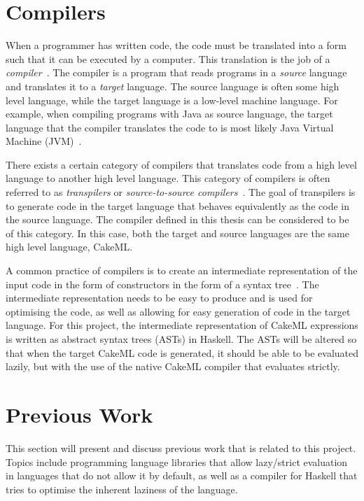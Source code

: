 \section{Compilers}
When a programmer has written code, the code must be translated into a form such
that it can be executed by a computer. This translation is the job of a
\textit{compiler}~\cite{DragonBook}. The compiler is a program that reads
programs in a \textit{source} language and translates it to a \textit{target}
language. The source language is often some high level language, while the
target language is a low-level machine language.
For example, when compiling programs with Java as source language, the target
language that the compiler translates the code to is most likely Java Virtual
Machine (JVM)~\cite{JavaJVM}.

There exists a certain category of compilers that translates code from a
high level language to another high level language. This category of compilers
is often referred to as \textit{transpilers} or
\textit{source-to-source compilers}~\cite{kulkarnitranspiler}.
The goal of transpilers is to generate code in the target language that behaves
equivalently as the code in the source language. The compiler defined in this %
thesis can be considered to be of this category. In this case, both the target
and source languages are the same high level language, CakeML.

A common practice of compilers is to create an intermediate representation of
the input code in the form of constructors in the form of a syntax
tree~\cite{DragonBook}. The intermediate representation needs to be
easy to produce and is used for optimising the code, as well as allowing for
easy generation of code in the target language.
For this project, the intermediate representation of CakeML expressions is %
written as abstract syntax trees (ASTs) in Haskell. The ASTs will be altered so
that when the target CakeML code is generated, it should be able to be evaluated
lazily, but with the use of the native CakeML compiler that evaluates strictly.


\section{Previous Work}
This section will present and discuss previous work that is related to this
project. Topics include programming language libraries that allow lazy/strict
evaluation in languages that do not allow it by default, as well as a compiler
for Haskell that tries to optimise the inherent laziness of the language.

